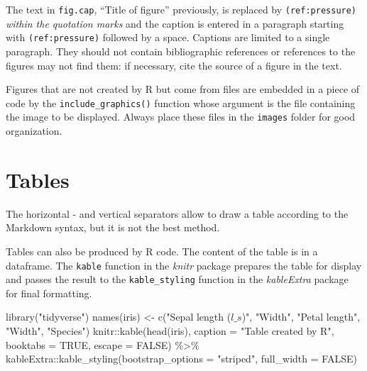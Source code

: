 \documentclass[
  12pt,
  american,
  a4paper,
  extrafontsizes,onecolumn,openright
  ]{memoir}
\newenvironment{Shaded}{\begin{snugshade}}{\end{snugshade}}
\newcommand{\AttributeTok}[1]{\textcolor[rgb]{0.77,0.63,0.00}{#1}}
\newcommand{\ConstantTok}[1]{\textcolor[rgb]{0.00,0.00,0.00}{#1}}
\newcommand{\FunctionTok}[1]{\textcolor[rgb]{0.00,0.00,0.00}{#1}}
\newcommand{\NormalTok}[1]{#1}
\newcommand{\OtherTok}[1]{\textcolor[rgb]{0.56,0.35,0.01}{#1}}
\newcommand{\SpecialCharTok}[1]{\textcolor[rgb]{0.00,0.00,0.00}{#1}}
\newcommand{\StringTok}[1]{\textcolor[rgb]{0.31,0.60,0.02}{#1}}
\begin{document}
\normalsize

The text in \texttt{fig.cap}, \enquote{Title of figure} previously, is replaced by \texttt{(ref:pressure)} \emph{within the quotation marks} and the caption is entered in a paragraph starting with \texttt{(ref:pressure)} followed by a space.
Captions are limited to a single paragraph.
They should not contain bibliographic references or references to the figures may not find them: if necessary, cite the source of a figure in the text.

Figures that are not created by R but come from files are embedded in a piece of code by the \texttt{include\_graphics()} function whose argument is the file containing the image to be displayed.
Always place these files in the \texttt{images} folder for good organization.

\hypertarget{tables}{%
\section{Tables}\label{tables}}

The horizontal - and vertical separators \textbar{} allow to draw a table according to the Markdown syntax, but it is not the best method.

Tables can also be produced by R code.
The content of the table is in a dataframe.
The \texttt{kable} function in the \emph{knitr} package prepares the table for display and passes the result to the \texttt{kable\_styling} function in the \emph{kableExtra} package for final formatting.

\scriptsize

\begin{Shaded}
\begin{Highlighting}[]
\FunctionTok{library}\NormalTok{(}\StringTok{"tidyverse"}\NormalTok{)}
\FunctionTok{names}\NormalTok{(iris) }\OtherTok{\textless{}{-}} \FunctionTok{c}\NormalTok{(}\StringTok{"Sepal length ($l\_s$)"}\NormalTok{, }\StringTok{"Width"}\NormalTok{, }\StringTok{"Petal length"}\NormalTok{,}
    \StringTok{"Width"}\NormalTok{, }\StringTok{"Species"}\NormalTok{)}
\NormalTok{knitr}\SpecialCharTok{::}\FunctionTok{kable}\NormalTok{(}\FunctionTok{head}\NormalTok{(iris), }\AttributeTok{caption =} \StringTok{"Table created by R"}\NormalTok{, }\AttributeTok{booktabs =} \ConstantTok{TRUE}\NormalTok{,}
    \AttributeTok{escape =} \ConstantTok{FALSE}\NormalTok{) }\SpecialCharTok{\%\textgreater{}\%}
\NormalTok{    kableExtra}\SpecialCharTok{::}\FunctionTok{kable\_styling}\NormalTok{(}\AttributeTok{bootstrap\_options =} \StringTok{"striped"}\NormalTok{,}
        \AttributeTok{full\_width =} \ConstantTok{FALSE}\NormalTok{)}
\end{Highlighting}
\end{Shaded}
\end{document}
